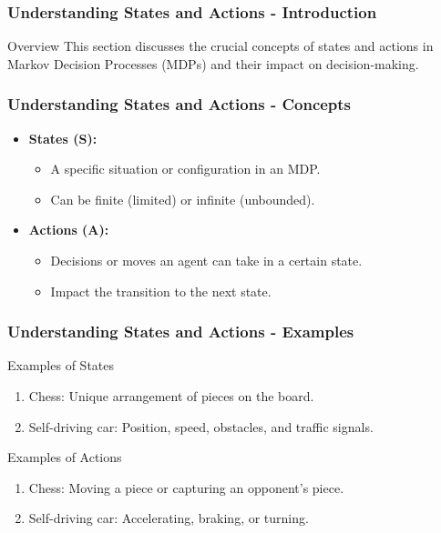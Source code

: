 \documentclass[aspectratio=169]{beamer}
\begin{document}
\begin{frame}[fragile]
    \frametitle{Understanding States and Actions - Introduction}
    \begin{block}{Overview}
        This section discusses the crucial concepts of states and actions in Markov Decision Processes (MDPs) and their impact on decision-making.
    \end{block}
\end{frame}

\begin{frame}[fragile]
    \frametitle{Understanding States and Actions - Concepts}
    \begin{itemize}
        \item \textbf{States (S):}
        \begin{itemize}
            \item A specific situation or configuration in an MDP.
            \item Can be finite (limited) or infinite (unbounded).
        \end{itemize}

        \item \textbf{Actions (A):}
        \begin{itemize}
            \item Decisions or moves an agent can take in a certain state.
            \item Impact the transition to the next state.
        \end{itemize}
    \end{itemize}
\end{frame}

\begin{frame}[fragile]
    \frametitle{Understanding States and Actions - Examples}
    \begin{block}{Examples of States}
        \begin{enumerate}
            \item Chess: Unique arrangement of pieces on the board.
            \item Self-driving car: Position, speed, obstacles, and traffic signals.
        \end{enumerate}
    \end{block}

    \begin{block}{Examples of Actions}
        \begin{enumerate}
            \item Chess: Moving a piece or capturing an opponent's piece.
            \item Self-driving car: Accelerating, braking, or turning.
        \end{enumerate}
    \end{block}
\end{frame}
\end{document}
